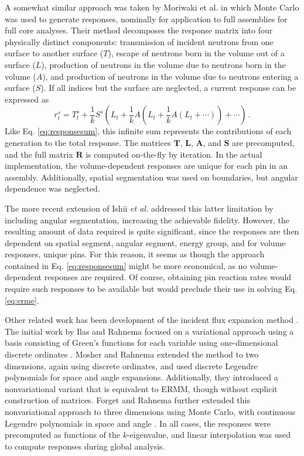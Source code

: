 A somewhat similar approach was taken by Moriwaki et al. 
\cite{moriwaki1999ndc}
in which Monte Carlo was used to 
generate responses, nominally for application to
full assemblies for full core analyses. 
Their method decomposes the response
matrix into four physically distinct components: 
transmission of incident neutrons from one surface to another surface ($T$), 
escape of neutrons born in the volume out of a surface ($L$), 
production of neutrons in the volume due to neutrons born in the volume ($A$), 
and production of neutrons in the volume due to neutrons 
entering a surface ($S$). If all indices but the 
surface are neglected, a current response can be expressed as
\begin{equation}
 r^{s}_{t} = T^s_t + \frac{1}{k}S^s(L_t + \frac{1}{k}A(L_t 
                   + \frac{1}{k}A(L_t + \cdots )) + \cdots) \, .
\label{eq:responseiterate}
\end{equation}
Like Eq. \ref{eq:responsesum}, this infinite sum 
represents the contributions of each generation to the 
total response.  The
matrices $\mathbf{T}$, $\mathbf{L}$, $\mathbf{A}$, and $\mathbf{S}$ 
are precomputed, and the full matrix $\mathbf{R}$ is
computed on-the-fly by iteration.  In the actual
implementation, the volume-dependent responses are
 unique for each pin in an assembly.  
Additionally, spatial segmentation was used on
boundaries, but angular dependence was neglected.

The more
recent extension of Ishii {\it et al.} addressed this latter 
limitation by including angular
segmentation, increasing the achievable 
fidelity. However, the resulting amount of data required
is quite significant, since the responses are then
dependent on spatial segment, angular segment, energy
group, and for volume responses, unique pins.
For this
reason, it seems as though the approach contained 
in Eq. \ref{eq:responsesum} might be more economical, as
no volume-dependent responses are required.  Of course,
obtaining pin reaction rates would require such 
responses to be available but would preclude their
use in solving Eq. \ref{eq:erme}.  

Other related work has been development of the incident
flux expansion method \cite{ilas2003hcm,mosher2006ifr}. The
initial work by Ilas and Rahnema focused on a variational
approach using a basis consisting of Green's functions
for each variable using one-dimensional discrete 
ordinates \cite{ilas2003hcm}.  Mosher and Rahnema extended the 
method to two dimensions, again using discrete ordinates,
and used discrete Legendre polynomials for space
and angle expansions.  Additionally, they
introduced a nonvariational 
variant that is equivalent to ERMM, though 
without explicit construction of matrices.  Forget and Rahnema
further extended this nonvariational approach to
three dimensions using Monte Carlo, with continuous
Legendre polynomials in space and angle \cite{forget2006tdh}.
In all cases, the responses were precomputed as functions
of the $k$-eigenvalue, and linear interpolation was
used to compute responses during global analysis.

